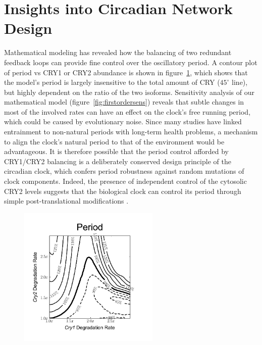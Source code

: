   \section{Insights into Circadian Network Design}
  Mathematical modeling has revealed how the balancing of two redundant feedback loops can provide fine control over the oscillatory period. A contour plot of period vs CRY1 or CRY2 abundance is shown in figure~\ref{fig:simultaneouskdown}, which shows that the model's period is largely insensitive to the total amount of CRY ($45^\circ$ line), but highly dependent on the ratio of the two isoforms. Sensitivity analysis of our mathematical model (figure~\ref{fig:firstordersens}) reveals that subtle changes in most of the involved rates can have an effect on the clock’s free running period, which could be caused by evolutionary noise. Since many studies have linked entrainment to non-natural periods with long-term health problems, a mechanism to align the clock’s natural period to that of the environment would be advantageous. It is therefore possible that the period control afforded by CRY1/CRY2 balancing is a deliberately conserved design principle of the circadian clock, which confers period robustness against random mutations of clock components. Indeed, the presence of independent control of the cytosolic CRY2 levels suggests that the biological clock can control its period through simple post-translational modifications \cite{Kurabayashi2010}. 

  \begin{figure}[bt]
    \centering
    \begin{minipage}{0.8\textwidth}
      \centering
      \includegraphics[width=0.6\textwidth]{chap2/figures/crysimultaneousknockdown.pdf}
        \label{fig:simultaneouskdown}
    \end{minipage}
  \end{figure}


